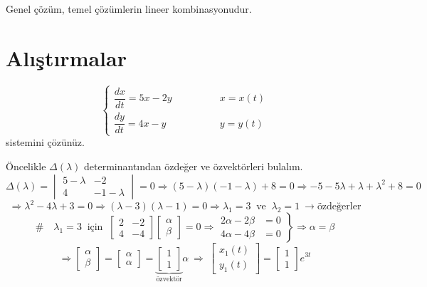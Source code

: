 \documentclass[11pt,a4paper]{article}
\begin{document}
Genel çözüm, temel çözümlerin lineer kombinasyonudur.

\section{Alıştırmalar}
\begin{ornek}[1]
\[
\begin{cases} \dfrac{dx}{dt} = 5x - 2y & \qquad\qquad x = x(t) \\[3mm] \dfrac{dy}{dt} = 4x - y & \qquad\qquad y = y(t) \end{cases}
\]
sistemini çözünüz.
\end{ornek}
\begin{cozum}
Öncelikle $\Delta(\lambda)$ determinantından özdeğer ve özvektörleri bulalım.
\[
\Delta(\lambda) = \begin{vmatrix} 5-\lambda & -2 \\ 4 & -1-\lambda \end{vmatrix} = 0 \Rightarrow (5-\lambda)(-1-\lambda) + 8 = 0 \Rightarrow -5 - 5\lambda + \lambda + \lambda^2 + 8 = 0
\]
\[
\Rightarrow \lambda^2 - 4\lambda + 3 = 0 \Rightarrow (\lambda-3)(\lambda-1) = 0 \Rightarrow \lambda_1 = 3 \ \text{ ve } \ \lambda_2 = 1 \ \rightarrow \text{özdeğerler}
\]
\[
\# \quad \lambda_1 = 3 \ \text{ için } \ \begin{bmatrix} 2 & -2 \\ 4 & -4 \end{bmatrix}\begin{bmatrix} \alpha \\ \beta \end{bmatrix} = 0 \Rightarrow \left.\begin{aligned} 2\alpha - 2\beta &= 0 \\ 4\alpha - 4\beta &= 0 \end{aligned}\right\} \Rightarrow \alpha = \beta
\]
\[
\Rightarrow \begin{bmatrix} \alpha \\ \beta \end{bmatrix} = \begin{bmatrix} \alpha \\ \alpha \end{bmatrix} = \underbrace{\begin{bmatrix} 1 \\ 1 \end{bmatrix}}_{\text{özvektör}} \alpha \ \Rightarrow \ \begin{bmatrix} x_1(t) \\ y_1(t) \end{bmatrix} = \begin{bmatrix} 1 \\ 1 \end{bmatrix} e^{3t}
\]
\end{cozum}
\end{document}
